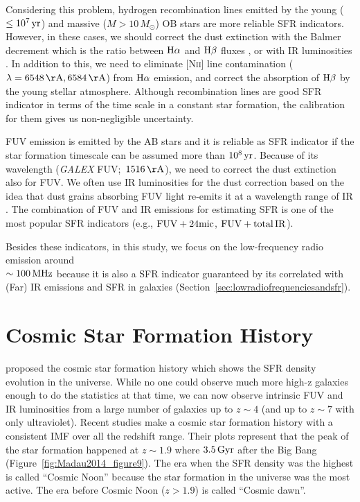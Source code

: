 Considering this problem, hydrogen recombination lines emitted by the young ($\leq 10^7\,\mathrm{yr}$) and massive ($M > 10\,M_{\odot}$) OB stars are more reliable SFR indicators.
However, in these cases, we should correct the dust extinction with the Balmer decrement which is the ratio between $\mathrm{H\alpha}$ and $\mathrm{H\beta}$ fluxes \citep{Lequeux1981}, or with IR luminosities \citep{Kennicutt2009}.
In addition to this, we need to eliminate [N\textsc{ii}] line contamination ($\lambda = 6548\,\mr{\AA}, 6584\,\mr{\AA}$) from $\mathrm{H}\alpha$ emission, and correct the absorption of $\mathrm{H\beta}$ by the young stellar atmosphere.
Although recombination lines are good SFR indicator in terms of the time scale in a constant star formation, the calibration for them gives us non-negligible uncertainty.

FUV emission is emitted by the AB stars and it is reliable as SFR indicator if the star formation timescale can be assumed more than $10^8\,\mathrm{yr}$.
Because of its wavelength ({\it GALEX\/} FUV;~$1516\,\mr{\AA}$), we need to correct the dust extinction also for FUV\@.
We often use IR luminosities for the dust correction based on the idea that dust grains absorbing FUV light re-emits it at a wavelength range of IR \citep{Kennicutt1998, Murphy2011}.
The combination of FUV and IR emissions for estimating SFR is one of the most popular SFR indicators (e.g., $\mathrm{FUV + 24mic}$, $\mathrm{FUV + total\,IR}$).

Besides these indicators, in this study, we focus on the low-frequency radio emission around\\ $\sim100\,\mathrm{MHz}$ because it is also a SFR indicator guaranteed by its correlated with (Far) IR emissions and SFR in galaxies (Section~\ref{sec:lowradiofrequenciesandsfr}).





\section{Cosmic Star Formation History}\label{sec:cosmicstarformationhistory}

\citet{Tinsley1980} proposed the cosmic star formation history which shows the SFR density evolution in the universe.
While no one could observe much more high-z galaxies enough to do the statistics at that time, we can now observe intrinsic FUV and IR luminosities from a large number of galaxies up to $z \sim 4$ (and up to $z \sim 7$ with only ultraviolet).
    Recent studies \citep{Hopkins2006, Madau2014} make a cosmic star formation history with a consistent IMF over all the redshift range.
Their plots represent that the peak of the star formation happened at $z\sim1.9$ where $3.5\,\mathrm{Gyr}$ after the Big Bang (Figure~\ref{fig:Madau2014_figure9}).
The era when the SFR density was the highest is called ``Cosmic Noon'' because the star formation in the universe was the most active.
The era before Cosmic Noon ($z > 1.9$) is called  ``Cosmic dawn''.


